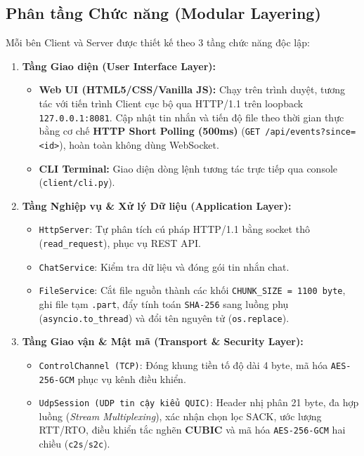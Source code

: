 \subsection{Phân tầng Chức năng (Modular Layering)}
Mỗi bên Client và Server được thiết kế theo 3 tầng chức năng độc lập:
\begin{enumerate}
    \item \textbf{Tầng Giao diện (User Interface Layer):}
    \begin{itemize}
        \item \textbf{Web UI (HTML5/CSS/Vanilla JS):} Chạy trên trình duyệt, tương tác với tiến trình Client cục bộ qua HTTP/1.1 trên loopback \texttt{127.0.0.1:8081}. Cập nhật tin nhắn và tiến độ file theo thời gian thực bằng cơ chế \textbf{HTTP Short Polling (500ms)} (\texttt{GET /api/events?since=<id>}), hoàn toàn không dùng WebSocket.
        \item \textbf{CLI Terminal:} Giao diện dòng lệnh tương tác trực tiếp qua console (\texttt{client/cli.py}).
    \end{itemize}
    \item \textbf{Tầng Nghiệp vụ \& Xử lý Dữ liệu (Application Layer):}
    \begin{itemize}
        \item \texttt{HttpServer}: Tự phân tích cú pháp HTTP/1.1 bằng socket thô (\texttt{read\_request}), phục vụ REST API.
        \item \texttt{ChatService}: Kiểm tra dữ liệu và đóng gói tin nhắn chat.
        \item \texttt{FileService}: Cắt file nguồn thành các khối \texttt{CHUNK\_SIZE = 1100 byte}, ghi file tạm \texttt{.part}, đẩy tính toán \texttt{SHA-256} sang luồng phụ (\texttt{asyncio.to\_thread}) và đổi tên nguyên tử (\texttt{os.replace}).
    \end{itemize}
    \item \textbf{Tầng Giao vận \& Mật mã (Transport \& Security Layer):}
    \begin{itemize}
        \item \texttt{ControlChannel (TCP)}: Đóng khung tiền tố độ dài 4 byte, mã hóa \texttt{AES-256-GCM} phục vụ kênh điều khiển.
        \item \texttt{UdpSession (UDP tin cậy kiểu QUIC)}: Header nhị phân 21 byte, đa hợp luồng (\textit{Stream Multiplexing}), xác nhận chọn lọc SACK, ước lượng RTT/RTO, điều khiển tắc nghẽn \textbf{CUBIC} và mã hóa \texttt{AES-256-GCM} hai chiều (\texttt{c2s}/\texttt{s2c}).
    \end{itemize}
\end{enumerate}

